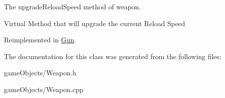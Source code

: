 The upgrade\+Reload\+Speed method of weapon. 

Virtual Method that will upgrade the current Reload Speed 

Reimplemented in \hyperlink{class_gun_a88408d572350474609c2fc294a6b807b}{Gun}.



The documentation for this class was generated from the following files\+:\begin{DoxyCompactItemize}
\item 
game\+Objects/Weapon.\+h\item 
game\+Objects/Weapon.\+cpp\end{DoxyCompactItemize}
